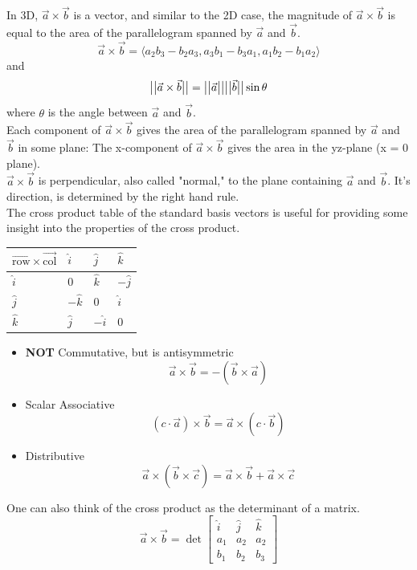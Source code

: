 \noindent
In 3D, $\vec{a}\times\vec{b}$ is a vector, and similar to the 2D case, the magnitude of $\vec{a}\times\vec{b}$ is equal to the area of the parallelogram spanned by $\vec{a}$ and $\vec{b}$.
\begin{equation*}
	\vec{a}\times\vec{b} = \langle a_2b_3-b_2a_3,a_3b_1-b_3a_1,a_1b_2-b_1a_2 \rangle
\end{equation*}
and
\begin{equation*}
	\big\lvert \big\lvert \vec{a}\times\vec{b} \big\rvert \big\rvert=\big\lvert \big\lvert \vec{a} \big\rvert \big\rvert\big\lvert \big\lvert \vec{b} \big\rvert \big\rvert\sin{\theta}
\end{equation*}
where $\theta$ is the angle between $\vec{a}$ and $\vec{b}$.\\
Each component of $\vec{a}\times\vec{b}$ gives the area of the parallelogram spanned by $\vec{a}$ and $\vec{b}$ in some plane: The x-component of $\vec{a}\times\vec{b}$ gives the area in the yz-plane (x = 0 plane).\\
$\vec{a}\times\vec{b}$ is perpendicular, also called "normal," to the plane containing $\vec{a}$ and $\vec{b}$. It's direction, is determined by the right hand rule.\\

\noindent
The cross product table of the standard basis vectors is useful for providing some insight into the properties of the cross product.
\begin{table}[H]
	\centering
	\renewcommand{\arraystretch}{1.5}
	\begin{tabular}{|l|l|l|l|}
		\hline
		$\overrightarrow{\text{row}}\times\overrightarrow{\text{col}}$ & $\hat{i}$  & $\hat{j}$  & $\hat{k}$  \\ \hline
		$\hat{i}$                                & $0$        & $\hat{k}$  & $-\hat{j}$ \\ \hline
		$\hat{j}$                                & $-\hat{k}$ & $0$        & $\hat{i}$  \\ \hline
		$\hat{k}$                                & $\hat{j}$  & $-\hat{i}$ & $0$        \\ \hline
	\end{tabular}
\end{table}

\begin{itemize}
	\item \textbf{NOT} Commutative, but is antisymmetric
	\begin{equation*}
		\vec{a}\times\vec{b} = -\left(\vec{b}\times\vec{a}\right)
	\end{equation*}
	\item Scalar Associative
	\begin{equation*}
		\left(c\cdot\vec{a}\right)\times\vec{b}=\vec{a}\times\left(c\cdot\vec{b}\right)
	\end{equation*}
	\item Distributive
	\begin{equation*}
		\vec{a}\times\left(\vec{b}\times\vec{c}\right) = \vec{a}\times\vec{b} + \vec{a}\times\vec{c}
	\end{equation*}
\end{itemize}

\noindent
One can also think of the cross product as the determinant of a matrix.
\begin{equation*}
	\vec{a}\times\vec{b} = \det\begin{bmatrix}
		\hat{i}& \hat{j} & \hat{k} \\
		a_1 & a_2 & a_2\\
		b_1 & b_2 & b_3 
	\end{bmatrix}
\end{equation*}